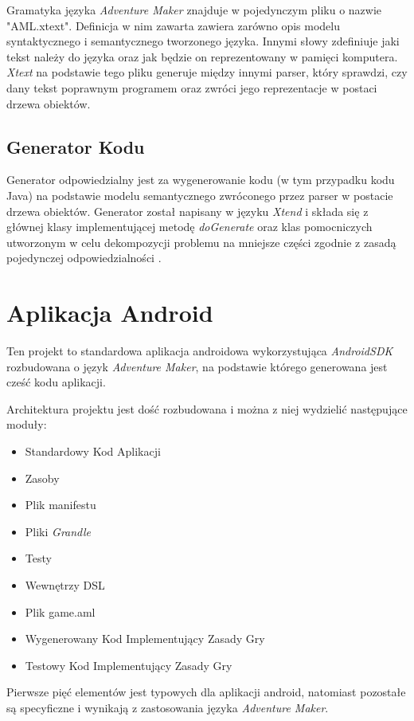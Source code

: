 \documentclass[openright]{xmgr}
\begin{document}
Gramatyka języka \textit{Adventure Maker} znajduje w pojedynczym pliku o nazwie "AML.xtext". Definicja w nim zawarta zawiera zarówno opis modelu syntaktycznego i semantycznego tworzonego języka. Innymi słowy zdefiniuje jaki tekst należy do języka oraz jak będzie on reprezentowany w pamięci komputera. \textit{Xtext} na podstawie tego pliku generuje między innymi parser, który sprawdzi, czy dany tekst poprawnym programem oraz zwróci jego reprezentacje w postaci drzewa obiektów.

\subsection{Generator Kodu}
Generator odpowiedzialny jest za wygenerowanie kodu (w tym przypadku kodu Java) na podstawie modelu semantycznego zwróconego przez parser w postacie drzewa obiektów. Generator został napisany w języku \textit{Xtend} i składa się z głównej klasy implementującej metodę \textit{doGenerate} oraz klas pomocniczych utworzonym w celu dekompozycji problemu na mniejsze części zgodnie z zasadą pojedynczej odpowiedzialności \cite{CleanCode:2005}.

\section{Aplikacja Android}
Ten projekt to standardowa aplikacja androidowa wykorzystująca \textit{AndroidSDK} rozbudowana o język \textit{Adventure Maker}, na podstawie którego generowana jest cześć kodu aplikacji.

Architektura projektu jest dość rozbudowana i można z niej wydzielić następujące moduły:

\begin{itemize}
	\item Standardowy Kod Aplikacji
	\item Zasoby
	\item Plik manifestu
	\item Pliki \textit{Grandle}
	\item Testy
	\item Wewnętrzy DSL
	\item Plik game.aml
	\item Wygenerowany Kod Implementujący Zasady Gry
	\item Testowy Kod Implementujący Zasady Gry
\end{itemize}

Pierwsze pięć elementów jest typowych dla aplikacji android, natomiast pozostałe są specyficzne i wynikają z zastosowania języka \textit{Adventure Maker}.
\end{document}
